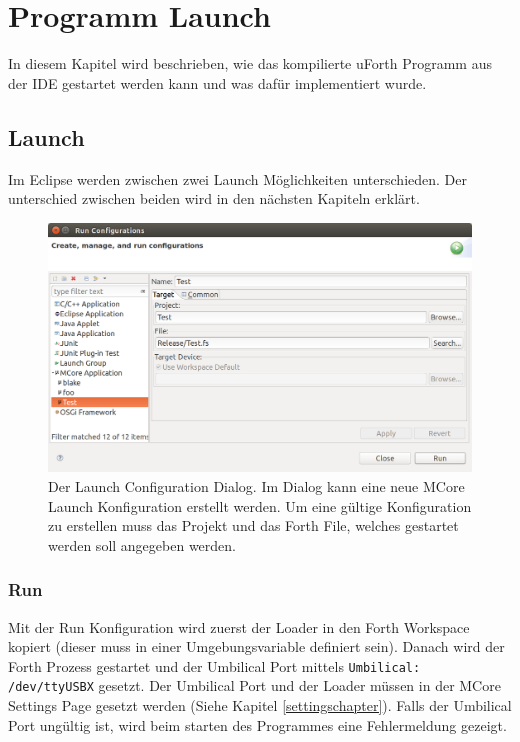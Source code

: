 \chapter{Programm Launch}
In diesem Kapitel wird beschrieben, wie das kompilierte uForth Programm aus der IDE gestartet werden kann und was dafür implementiert wurde.

\section{Launch}

Im Eclipse werden zwischen zwei Launch Möglichkeiten unterschieden. Der unterschied zwischen beiden wird in den nächsten Kapiteln erklärt.

\begin{figure}[H]
	\centering
		\includegraphics[scale=0.3]{launch/run.png}
		\caption{Der Launch Configuration Dialog. Im Dialog kann eine neue MCore Launch Konfiguration erstellt werden. Um eine gültige Konfiguration zu erstellen muss das Projekt und das Forth File, welches gestartet werden soll angegeben werden.}
		\label{fig:extensionpoint}
\end{figure}

\newpage
\subsection{Run}

Mit der Run Konfiguration wird zuerst der Loader in den Forth Workspace kopiert (dieser muss in einer Umgebungsvariable definiert sein). Danach wird der Forth Prozess gestartet und der Umbilical Port mittels \verb!Umbilical: /dev/ttyUSBX! gesetzt. Der Umbilical Port und der Loader müssen in der MCore Settings Page gesetzt werden (Siehe Kapitel \ref{settingschapter}). Falls der Umbilical Port ungültig ist, wird beim starten des Programmes eine Fehlermeldung gezeigt.

